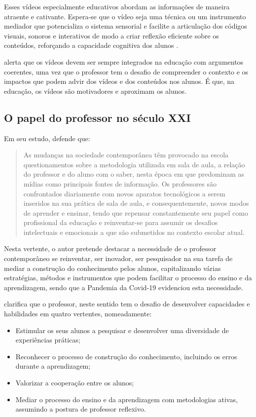 \documentclass[portuguese]{textolivre}
\begin{document}
Esses vídeos especialmente educativos abordam as informações de maneira atraente e cativante. Espera-se que o vídeo seja uma técnica ou um instrumento mediador que potencializa o sistema sensorial e facilite a articulação dos códigos visuais, sonoros e interativos de modo a criar reflexão eficiente sobre os conteúdos, reforçando a capacidade cognitiva dos alunos \cite{oliveira2014}.

\textcite{deckert2010} alerta que os vídeos devem ser sempre integrados na educação com argumentos coerentes, uma vez que o professor tem o desafio de compreender o contexto e os impactos que podem advir dos vídeos e dos conteúdos nos alunos. É que, na educação, os vídeos são motivadores e aproximam os alunos.

\subsection{O papel do professor no século XXI}
Em seu estudo, \textcite[p. 20]{deckert2010} defende que:

\begin{quote}
    As mudanças na sociedade contemporânea têm provocado na escola questionamentos sobre a metodologia utilizada em sala de aula, a relação do professor e do aluno com o saber, nesta época em que predominam as mídias como principais fontes de informação. Os professores são confrontados diariamente com novos aparatos tecnológicos a serem inseridos na sua prática de sala de aula, e consequentemente, novos modos de aprender e ensinar, tendo que repensar constantemente seu papel como profissional da educação e reinventar-se para assumir os desafios intelectuais e emocionais a que são submetidos no contexto escolar atual. 
\end{quote}

Nesta vertente, o autor pretende destacar a necessidade de o professor contemporâneo se reinventar, ser inovador, ser pesquisador na sua tarefa de mediar a construção do conhecimento pelos alunos, capitalizando várias estratégias, métodos e instrumentos que podem facilitar o processo do ensino e da aprendizagem, sendo que a Pandemia da Covid-19 evidenciou esta necessidade.

 clarifica que o professor, neste sentido tem o desafio de desenvolver capacidades e habilidades em quatro vertentes, nomeadamente:

\begin{itemize}
    \item Estimular os seus alunos a pesquisar e desenvolver uma diversidade de experiências práticas;
    \item Reconhecer o processo de construção do conhecimento, incluindo os erros durante a aprendizagem;
    \item Valorizar a cooperação entre os alunos;
    \item Mediar o processo do ensino e da aprendizagem com metodologias ativas, assumindo a postura de professor reflexivo.
\end{itemize}
\end{document}
